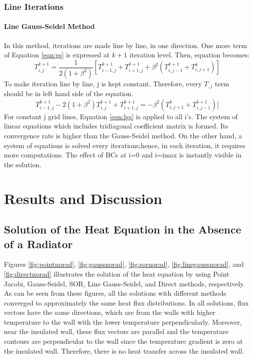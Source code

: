 \documentclass[letterpaper,12pt]{article}
\begin{document}
\subsubsection{Line Iterations}
\paragraph{Line Gauss-Seidel Method} In this method, iterations are made line by line, in one direction. One more term of Equation
\ref{eqn:gs} is expressed at $k+1$ iteration level. Then, equation becomes:
\begin{equation}
	T_{i,j}^{k+1}=\frac{1}{2(1+\beta^2)}[T_{i-1,j}^{k+1}+T_{i+1,j}^{k+1}+\beta ^2(T_{i,j-1}^{k+1}+T_{i,j+1}^{k})]
\end{equation}
To make iteration line by line, j is kept constant. Therefore, every $T_{ ,j}$ term should be in left
hand side of the equation.
\begin{equation}
	T_{i-1,j}^{k+1}-2(1+\beta^2)T_{i,j}^{k+1}+T_{i+1,j}^{k+1}=-\beta^2(T_{i,j+1}^{k}+T_{i,j-1}^{k+1})]
\label{eqn:lgs}
\end{equation}
For constant j grid lines, Equation \ref{eqn:lgs} is applied to all i's. The
system of linear equations which includes tridiagonal coefficient matrix is formed. Its
convergence rate is higher than the Gauss-Seidel method. On the other hand, a system of equations
is solved every iterations;hence, in each iteration, it requires more computations.
The effect of BCs at i=0 and i=imax is instantly visible in the solution.
\newpage
\section{Results and Discussion}

\subsection{Solution of the Heat Equation in the Absence of a Radiator}
Figures \ref{fig:pointnorad}, \ref{fig:gaussnorad}, \ref{fig:sornorad}, \ref{fig:linegaussnorad}, and \ref{fig:directnorad}
illustrates the solution of the heat equation by using Point Jacobi, Gauss-Seidel,
SOR, Line Gauss-Seidel, and Direct methods, respectively. As can be seen from these figures, all the solutions
with different methods converged to approximately the same heat flux distributions.
In all solutions, flux vectors have the same directions, which are from the walls
with higher temperature to the wall with the lower temperature perpendicularly.
Moreover, near the insulated wall, these flux vectors are parallel and the temperature
contours are perpendicular to the wall since the temperature gradient is zero at the
insulated wall. Therefore, there is no heat transfer across the insulated wall. 
\end{document}
